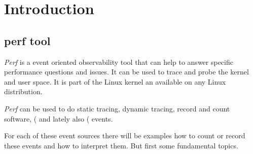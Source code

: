 \chapter{Introduction}
\section{perf tool}
{\em Perf} is a event oriented observability tool that can help to
answer specific performance questions and issues. It can be used
to trace and probe the kernel and user space. It is part of the
Linux kernel an available on any Linux distribution.

{\em Perf} can be used to do static tracing, dynamic tracing, record
and count software,  (\PMU\) and
lately also  (\eBPF\) events.

For each of these event sources there will be examples how to count or
record these events and how to interpret them. But first some
fundamental topics.
